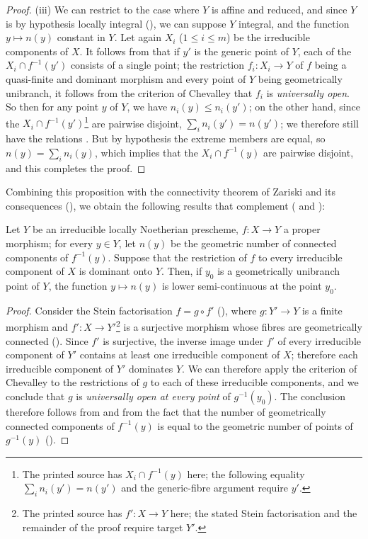 \begin{proof}
(iii)
We can restrict to the case where $Y$ is affine and reduced, and since $Y$ is by hypothesis locally integral (), we can suppose $Y$ integral, and the function $y\mapsto n(y)$ constant in $Y$.
Let again $X_i$ ($1\leq i\leq m$) be the irreducible components of $X$.
It follows from  that if $y'$ is the generic point of $Y$, each of the $X_i\cap f^{-1}(y')$ consists of a single point; the restriction $f_i:X_i\to Y$ of $f$ being a quasi-finite and dominant morphism and every point of $Y$ being geometrically unibranch, it follows from the criterion of Chevalley  that $f_i$ is \emph{universally open}.
So then for any point $y$ of $Y$, we have $n_i(y)\leq n_i(y')$; on the other hand, since the $X_i\cap f^{-1}(y')$\footnote{The printed source has $X_i\cap f^{-1}(y)$ here; the following equality $\sum_i n_i(y')=n(y')$ and the generic-fibre argument require $y'$.} are pairwise disjoint, $\sum_i n_i(y')=n(y')$; we therefore still have the relations .
But by hypothesis the extreme members are equal, so $n(y)=\sum_i n_i(y)$, which implies that the $X_i\cap f^{-1}(y)$ are pairwise disjoint, and this completes the proof.
\end{proof}

Combining this proposition with the connectivity theorem of Zariski and its consequences (), we obtain the following results that complement ( and ):

\begin{proposition}[15.5.3]
\label{IV.15.5.3}
Let $Y$ be an irreducible locally Noetherian prescheme, $f:X\to Y$ a proper morphism; for every $y\in Y$, let $n(y)$ be the geometric number of connected components  of $f^{-1}(y)$.
Suppose that the restriction of $f$ to every irreducible component of $X$ is dominant onto $Y$.
Then, if $y_0$ is a geometrically unibranch point of $Y$, the function $y\mapsto n(y)$ is lower semi-continuous at the point $y_0$.
\end{proposition}

\begin{proof}
Consider the Stein factorisation $f=g\circ f'$ (), where $g:Y'\to Y$ is a finite morphism and $f':X\to Y'$\footnote{The printed source has $f':X\to Y$ here; the stated Stein factorisation and the remainder of the proof require target $Y'$.} is a surjective morphism whose fibres are geometrically connected ().
Since $f'$ is surjective, the inverse image under $f'$ of every irreducible component of $Y'$ contains at least one irreducible component of $X$; therefore each irreducible component of $Y'$ dominates $Y$.
We can therefore apply the criterion of Chevalley  to the restrictions of $g$ to each of these irreducible components, and we conclude that $g$ is \emph{universally open at every point} of $g^{-1}(y_0)$.
The conclusion therefore follows from  and from the fact that the number of geometrically connected components of $f^{-1}(y)$ is equal to the geometric number of points of $g^{-1}(y)$ ().
\end{proof}

